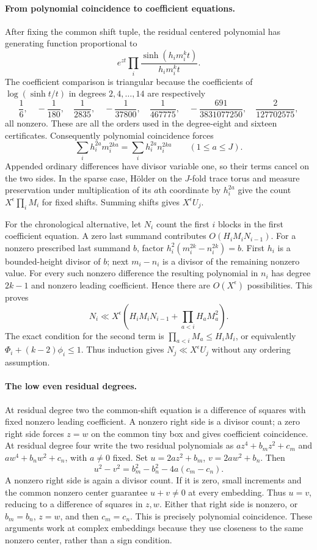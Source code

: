 \documentclass[11pt,reqno]{amsart}
\numberwithin{equation}{section}
\theoremstyle{definition}
\begin{document}
\paragraph{From polynomial coincidence to coefficient equations.}
After fixing the common shift tuple, the residual centered polynomial has
generating function proportional to
\[
 e^{zt}\prod_i\frac{\sinh(h_im_i^kt)}{h_im_i^kt}.
\]
The coefficient comparison is triangular because the coefficients of
$\log(\sinh t/t)$ in degrees $2,4,\ldots,14$ are respectively
\[
 \frac16,\quad-\frac1{180},\quad\frac1{2835},\quad
 -\frac1{37800},\quad\frac1{467775},\quad
 -\frac{691}{3831077250},\quad\frac2{127702575},
\]
all nonzero.  These are all the orders used in the degree-eight and
sixteen certificates.  Consequently polynomial coincidence forces
\[
 \sum_i h_i^{2a}m_i^{2ka}=\sum_i h_i^{2a}n_i^{2ka}
                        \qquad(1\le a\le J).
\]
Appended ordinary differences have divisor variable one, so their terms
cancel on the two sides.  In the sparse case, H\"older on the $J$-fold
trace torus and measure preservation under multiplication of its $a$th
coordinate by $h_i^{2a}$ give the count $X^\epsilon\prod_iM_i$ for fixed
shifts.  Summing shifts gives $X^\epsilon U_j$.

For the chronological alternative, let $N_i$ count the first $i$ blocks
in the first coefficient equation.  A zero last summand contributes
$O(H_iM_iN_{i-1})$.  For a nonzero prescribed last summand $b$, factor
$h_i^2(m_i^{2k}-n_i^{2k})=b$.  First $h_i$ is a bounded-height divisor of
$b$; next $m_i-n_i$ is a divisor of the remaining nonzero value.  For every
such nonzero difference the resulting polynomial in $n_i$ has degree
$2k-1$ and nonzero leading coefficient.  Hence there are $O(X^\epsilon)$
possibilities.  This proves
\[
 N_i\ll X^\epsilon\left(H_iM_iN_{i-1}
                  +\prod_{a<i}H_aM_a^2\right).
\]
The exact condition for the second term is
$\prod_{a<i}M_a\le H_iM_i$, or equivalently
$\Phi_i+(k-2)\phi_i\le1$.  Thus induction gives $N_j\ll X^\epsilon U_j$
without any ordering assumption.

\paragraph{The low even residual degrees.}
At residual degree two the common-shift equation is a difference of
squares with fixed nonzero leading coefficient.  A nonzero right side
is a divisor count; a zero right side forces $z=w$ on the common tiny
box and gives coefficient coincidence.
At residual degree four write the two residual polynomials as
$az^4+b_mz^2+c_m$ and $aw^4+b_nw^2+c_n$, with $a\ne0$ fixed.
Set $u=2az^2+b_m$, $v=2aw^2+b_n$.  Then
\[
        u^2-v^2=b_m^2-b_n^2-4a(c_m-c_n).
\]
A nonzero right side is again a divisor count.  If it is zero, small
increments and the common nonzero center guarantee $u+v\ne0$ at every
embedding.  Thus $u=v$, reducing to a difference of squares in $z,w$.
Either that right side is nonzero, or $b_m=b_n$, $z=w$, and then
$c_m=c_n$.  This is precisely polynomial coincidence.  These arguments
work at complex embeddings because they use closeness to the same
nonzero center, rather than a sign condition.
\end{document}
